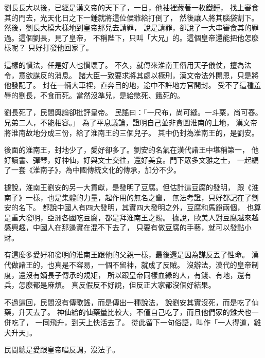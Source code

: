 劉長長大以後，已經是漢文帝的天下了，一日，他袖裡藏著一枚鐵錘，
找上審食其的門去，光天化日之下一錘就將這位侯爺給打倒了，
然後讓人將其腦袋割下。然後，劉長大模大樣地到皇帝那兒去請罪，
說是請罪，卻說了一大串審食其的罪過。這個劉長，見了皇帝，
不稱陛下，只叫「大兄」的。這個皇帝還能把他怎麼樣呢？
只好打發他回家了。

這樣的慣法，任是好人也慣壞了。
不久，就傳來淮南王僭用天子儀仗，擅為法令，意欲謀反的消息。
諸大臣一致要求將其處以極刑，漢文帝法外開恩，只是將他發配了。
封在一輛大車裡，直奔目的地，途中不許地方官開封。
受不了這種羞辱的劉長，不食而死。當然沒準兒，是給憋死、餓死的。

劉長死了，民間輿論卻批評皇帝。
民謠曰：「一尺布，尚可縫。一斗粟，尚可舂。兄弟二人，不能相容。」
為了平息議論，證明自己並非貪圖淮南的土地，
漢文帝將淮南故地分成三份，給了淮南王的三個兒子。
其中仍封為淮南王的，是劉安。

後面的淮南王，封地少了，愛好卻多了。劉安的名氣在漢代諸王中堪稱第一，
他好讀書、彈琴，好神仙，好與文士交往，還好美食。門下眾多文雅之士，
一起編了一套{\Kai《淮南子》}，為中國傳統文化的傳承，加分不少。

據說，淮南王劉安的另一大貢獻，是發明了豆腐。但估計這豆腐的發明，
跟{\Kai《淮南子》}一樣，也是集體的力量，起作用的無名之輩，
無法考證，只好都記在了劉安的名下。
都說中國人有四大發明，其實四大發明之外，豆腐和馬鐙兩個，
也算是重大發明，亞洲各國吃豆腐，都是拜淮南王之賜。
據說，歐美人對豆腐越來越感興趣，中國人在那邊實在混不下去了，
只要有做豆腐的手藝，就可以發點小財。

有這麼多愛好和發明的淮南王跟他的父親一樣，最後還是因為謀反丟了性命。
漢代做諸王的，也真是不容易，一個不留神，就成了反賊。
沒辦法，漢代的皇帝制度，還沒有嫡長子傳承的規矩，
所以跟皇帝同樣血緣的人，有錢、有地，還有兵，怎麼都是麻煩。
真反假反不好說，但反正大家都沒個好結果。

不過這回，民間沒有傳歌謠，而是傳出一種說法，
說劉安其實沒死，而是吃了仙藥，升天去了。
神仙給的仙藥量比較大，不僅自己吃了，而且他們家的雞犬也一併吃了，
一同飛升，到天上快活去了。
從此留下一句俗語，叫作「一人得道，雞犬升天」。

民間總是愛跟皇帝唱反調，沒法子。

